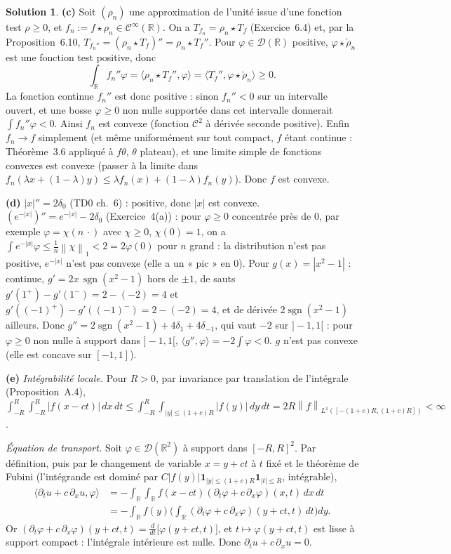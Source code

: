 \documentclass[11pt,a4paper]{article}
\newcommand{\R}{\mathbb{R}}
\newcommand{\norm}[1]{\left\|#1\right\|}
\newcommand{\Cinf}{\mathcal{C}^\infty}
\DeclareMathOperator{\sgn}{sgn}
\newcommand{\D}{\mathcal{D}}
\theoremstyle{definition}
\newtheorem*{solution}{Solution}
\begin{document}
\begin{solution}
\medskip
\noindent\textbf{(c)} Soit $(\rho_n)$ une approximation de l'unité issue d'une fonction test $\rho\ge0$, et $f_n:=f\star\rho_n\in\Cinf(\R)$. On a $T_{f_n}=\rho_n\star T_f$ (Exercice~6.4) et, par la Proposition~6.10, $T_{f_n''}=(\rho_n\star T_f)''=\rho_n\star T_f''$. Pour $\varphi\in\D(\R)$ positive, $\varphi\star\check\rho_n$ est une fonction test positive, donc
\[
\int_\R f_n''\varphi=\langle\rho_n\star T_f'',\varphi\rangle=\langle T_f'',\varphi\star\check\rho_n\rangle\ge0 .
\]
La fonction continue $f_n''$ est donc positive : sinon $f_n''<0$ sur un intervalle ouvert, et une bosse $\varphi\ge0$ non nulle supportée dans cet intervalle donnerait $\int f_n''\varphi<0$. Ainsi $f_n$ est convexe (fonction $\mathcal C^2$ à dérivée seconde positive). Enfin $f_n\to f$ simplement (et même uniformément sur tout compact, $f$ étant continue : Théorème~3.6 appliqué à $f\theta$, $\theta$ plateau), et une limite simple de fonctions convexes est convexe (passer à la limite dans $f_n(\lambda x+(1-\lambda)y)\le\lambda f_n(x)+(1-\lambda)f_n(y)$). Donc $f$ est convexe.

\medskip
\noindent\textbf{(d)} $|x|''=2\delta_0$ (TD0 ch.~6) : positive, donc $|x|$ est convexe. $(e^{-|x|})''=e^{-|x|}-2\delta_0$ (Exercice~4(a)) : pour $\varphi\ge0$ concentrée près de $0$, par exemple $\varphi=\chi(n\,\cdot)$ avec $\chi\ge0$, $\chi(0)=1$, on a $\int e^{-|x|}\varphi\le\frac1n\norm\chi_1<2=2\varphi(0)$ pour $n$ grand : la distribution n'est pas positive, $e^{-|x|}$ n'est pas convexe (elle a un « pic » en $0$). Pour $g(x)=|x^2-1|$ : continue, $g'=2x\,\sgn(x^2-1)$ hors de $\pm1$, de sauts $g'(1^+)-g'(1^-)=2-(-2)=4$ et $g'((-1)^+)-g'((-1)^-)=2-(-2)=4$, et de dérivée $2\sgn(x^2-1)$ ailleurs. Donc $g''=2\sgn(x^2-1)+4\delta_1+4\delta_{-1}$, qui vaut $-2$ sur $]-1,1[$ : pour $\varphi\ge0$ non nulle à support dans $]-1,1[$, $\langle g'',\varphi\rangle=-2\int\varphi<0$. $g$ n'est pas convexe (elle est concave sur $[-1,1]$).

\medskip
\noindent\textbf{(e)} \emph{Intégrabilité locale.} Pour $R>0$, par invariance par translation de l'intégrale (Proposition~A.4), $\int_{-R}^R\int_{-R}^R|f(x-ct)|\,dx\,dt\le\int_{-R}^R\int_{|y|\le(1+c)R}|f(y)|\,dy\,dt=2R\norm f_{L^1([-(1+c)R,(1+c)R])}<\infty$.

\emph{Équation de transport.} Soit $\varphi\in\D(\R^2)$ à support dans $[-R,R]^2$. Par définition, puis par le changement de variable $x=y+ct$ à $t$ fixé et le théorème de Fubini (l'intégrande est dominé par $C|f(y)|\mathbf 1_{|y|\le(1+c)R}\mathbf 1_{|t|\le R}$, intégrable),
\begin{align*}
\langle\partial_tu+c\,\partial_xu,\varphi\rangle&=-\int_\R\int_\R f(x-ct)(\partial_t\varphi+c\,\partial_x\varphi)(x,t)\,dx\,dt\\
&=-\int_\R f(y)\Big(\int_\R(\partial_t\varphi+c\,\partial_x\varphi)(y+ct,t)\,dt\Big)dy .
\end{align*}
Or $(\partial_t\varphi+c\,\partial_x\varphi)(y+ct,t)=\frac d{dt}\big[\varphi(y+ct,t)\big]$, et $t\mapsto\varphi(y+ct,t)$ est lisse à support compact : l'intégrale intérieure est nulle. Donc $\partial_tu+c\,\partial_xu=0$.


\end{solution}
\end{document}
